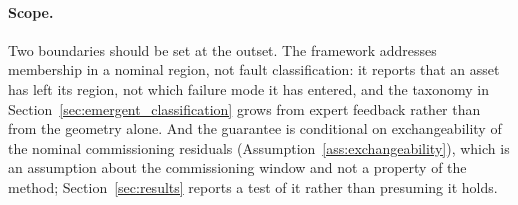 \paragraph{Scope.}
Two boundaries should be set at the outset. The framework addresses membership
in a nominal region, not fault classification: it reports that an asset has
left its region, not which failure mode it has entered, and the taxonomy in
Section~\ref{sec:emergent_classification} grows from expert feedback rather
than from the geometry alone. And the guarantee is conditional on
exchangeability of the nominal commissioning residuals
(Assumption~\ref{ass:exchangeability}), which is an assumption about the
commissioning window and not a property of the method; Section~\ref{sec:results}
reports a test of it rather than presuming it holds.

